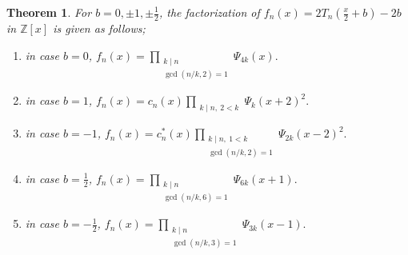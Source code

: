 \documentclass[a4paper, 11pt]{amsart}
\numberwithin{equation}{section}
\newtheorem{thm}{Theorem}[section]
\theoremstyle{definition}
\newcommand{\Z}{\mathbb{Z}}
\begin{document}
\begin{thm}\label{factorization-T}
For $b=0,\pm 1, \pm\frac12$, the factorization of $f_n(x)=2T_n\left(\frac{x}2+b\right)-2b$ in $\Z[x]$ is given as follows;
\begin{enumerate}[{\rm (1)}]
\item
in case $b=0$, 
$\displaystyle
f_n(x)=\prod_{\substack{k \mid n \\ \gcd(n/k, 2) = 1}} \Psi_{4k}(x).
$\medskip
\item
in case $b=1$, 
$\displaystyle
f_n(x)
=c_n(x)\prod_{\substack{k \mid n,\ 2 < k}} \Psi_k(x+2)^2.
$\medskip


\item
in case $b=-1$,
$\displaystyle
f_n(x)=c^*_n(x)\prod_{\substack{k \mid n,\ 1<k \\ \gcd(n/k, 2) = 1}} \Psi_{2k}(x-2)^2.
$\medskip

\item
in case $b=\frac12$,
$\displaystyle
f_n(x)=
\prod_{\substack{k \mid n \\ \gcd(n/k, 6) = 1}} \Psi_{6k}(x+1).
$\medskip

\item
in case $b=-\frac12$,
$\displaystyle
f_n(x)=
\prod_{\substack{k \mid n \\ \gcd(n/k, 3) = 1}} \Psi_{3k}(x-1).$
\end{enumerate}
\end{thm}
\end{document}
